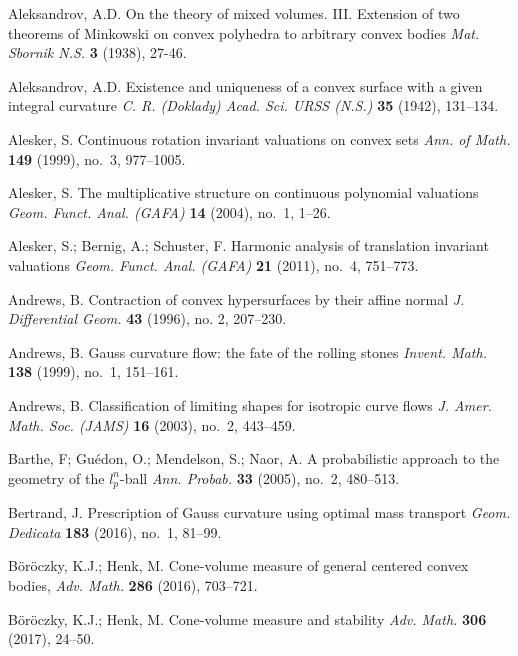 \documentclass{cpamart1}     %
\theoremstyle{definition}
\theoremstyle{remark}
\begin{document}
\frenchspacing

\begin{thebibliography}{99}

 Aleksandrov, A.D.
On the theory of mixed volumes. III. Extension
of two theorems of Minkowski on convex polyhedra to arbitrary convex
bodies 
\textit{Mat. Sbornik N.S.}
\textbf{3} (1938), 27-46.


Aleksandrov, A.D. 
Existence and uniqueness of a convex surface
with a given integral curvature 
\textit{C. R. (Doklady) Acad. Sci. URSS (N.S.)}
\textbf{35} (1942), 131--134.


Alesker, S.
Continuous rotation invariant valuations on convex sets
\textit{Ann. of Math.}
\textbf{149} (1999), no.\ 3, 977--1005.

Alesker, S.
The multiplicative structure on continuous polynomial valuations
\textit{Geom. Funct. Anal. (GAFA)}
\textbf{14} (2004), no.\ 1, 1--26.

Alesker, S.; Bernig, A.; Schuster, F.
Harmonic analysis of translation invariant valuations
\textit{Geom. Funct. Anal. (GAFA)}
\textbf{21} (2011), no.\ 4, 751--773.

Andrews, B.
Contraction of convex hypersurfaces by their affine normal
\textit{J. Differential Geom.}
\textbf{43} (1996), no. 2, 207--230.


Andrews, B.
Gauss curvature flow: the fate of the rolling stones
\textit{Invent. Math.}
\textbf{138} (1999), no.\ 1, 151--161.

Andrews, B.
Classification of limiting shapes for isotropic curve flows
\textit{J. Amer. Math. Soc. (JAMS)}
\textbf{16} (2003), no.\ 2, 443--459.

Barthe, F; Gu\'edon, O.; Mendelson, S.; Naor, A.
A probabilistic approach to the geometry of the $l_p^n$-ball
\textit{Ann. Probab.}
\textbf{33} (2005), no.\ 2, 480--513.

Bertrand, J.
Prescription of Gauss curvature using optimal mass transport
\textit{Geom. Dedicata}
\textbf{183} (2016), no.\ 1, 81--99.

B\"or\"oczky, K.J.; Henk, M.
Cone-volume measure of general centered convex bodies,
\textit{Adv. Math.}
\textbf{286} (2016), 703--721.

B\"or\"oczky, K.J.; Henk, M.
Cone-volume measure and stability
\textit{Adv. Math.}
\textbf{306}
(2017), 24--50.



\end{thebibliography}
\end{document}
